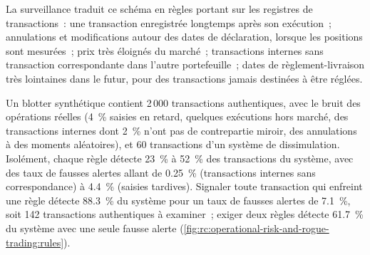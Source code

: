 La surveillance traduit ce schéma en règles portant sur les registres de transactions~: une transaction enregistrée longtemps après
son exécution~; annulations et modifications autour des dates de déclaration, lorsque les positions sont mesurées~; prix très
éloignés du marché~; transactions internes sans transaction correspondante dans l'autre portefeuille~; dates de règlement-livraison
très lointaines dans le futur, pour des transactions jamais destinées à être réglées.

\label{lst:rc:operational-risk-and-rogue-trading:rules}

\begin{example}\label{ex:rc:operational-risk-and-rogue-trading:rules}
Un blotter synthétique contient 2\,000 transactions authentiques, avec le bruit des opérations réelles (4~\% saisies en retard, quelques
exécutions hors marché, des transactions internes dont 2~\% n'ont pas de contrepartie miroir, des annulations à des moments aléatoires), et 60 transactions
d'un système de dissimulation. Isolément, chaque règle détecte 23~\% à 52~\% des transactions du système, avec des taux de fausses alertes
allant de 0.25~\% (transactions internes sans correspondance) à 4.4~\% (saisies tardives). Signaler toute transaction qui enfreint une règle
détecte 88.3~\% du système pour un taux de fausses alertes de 7.1~\%, soit 142 transactions authentiques à examiner~; exiger deux
règles détecte 61.7~\% du système avec une seule fausse alerte (\cref{fig:rc:operational-risk-and-rogue-trading:rules}).
\end{example}

